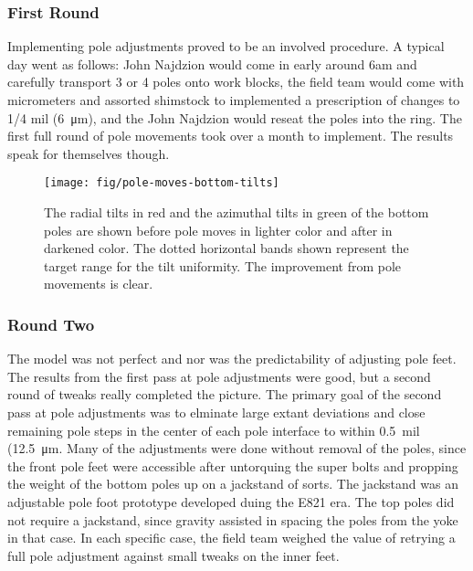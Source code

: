 
\subsubsection{First Round}

Implementing pole adjustments proved to be an involved procedure.  A typical day went as follows: John Najdzion would come in early around 6am and carefully transport 3 or 4 poles onto work blocks, the field team would come with micrometers and assorted shimstock to implemented a prescription of changes to 1/4 mil (\SI{6}{\micro\meter}), and the John Najdzion  would reseat the poles into the ring.  The first full round of pole movements took over a month to implement.  The results speak for themselves though.

\begin{figure}
\texttt{[image: fig/pole-moves-bottom-tilts]}
\caption{The radial tilts in red and the azimuthal tilts in green of the bottom poles are shown before pole moves in lighter color and after in darkened color.  The dotted horizontal bands shown represent the target range for the tilt uniformity.  The improvement from pole movements is clear.}
\label{fig:pole-moves-bottom-tilts}
\end{figure}

\subsubsection{Round Two}

The model was not perfect and nor was the predictability of adjusting pole feet.  The results from the first pass at pole adjustments were good, but a second round of tweaks really completed the picture.  The primary goal of the second pass at pole adjustments was to elminate large extant deviations and close remaining pole steps in the center of each pole interface to within \SI{0.5}{mil} (\SI{12.5}{\micro\meter}.  Many of the adjustments were done without removal of the poles, since the front pole feet were accessible after untorquing the super bolts and propping the weight of the bottom poles up on a jackstand of sorts.  The jackstand was an adjustable pole foot prototype developed duing the E821 era.  The top poles did not require a jackstand, since gravity assisted in spacing the poles from the yoke in that case.  In each specific case, the field team weighed the value of retrying a full pole adjustment against small tweaks on the inner feet.

